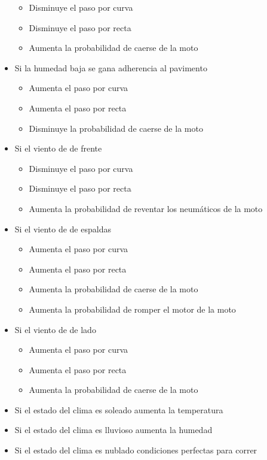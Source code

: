 \documentclass[12pt, letterpaper,spanish]{article}
\theoremstyle{definition}
\theoremstyle{remark}
\begin{document}
\begin{itemize}
\begin{itemize}
			\item Disminuye el paso por curva
			\item Disminuye el paso por recta
			\item Aumenta la probabilidad de caerse de la moto
		\end{itemize}
		\item Si la humedad baja se gana adherencia al pavimento
		\begin{itemize}
			\item Aumenta el paso por curva
			\item Aumenta el paso por recta
			\item Disminuye la probabilidad de caerse de la moto
		\end{itemize}
		
		\item Si el viento de de frente
		\begin{itemize}
			\item Disminuye el paso por curva
			\item Disminuye el paso por recta
			\item Aumenta la probabilidad de reventar los neumáticos de la moto
		\end{itemize}
		\item Si el viento de de espaldas
		\begin{itemize}
			\item Aumenta el paso por curva
			\item Aumenta el paso por recta
			\item Aumenta la probabilidad de caerse de la moto
			\item Aumenta la probabilidad de romper el motor de la moto
		\end{itemize}
		\item Si el viento de de lado
		\begin{itemize}
			\item Aumenta el paso por curva
			\item Aumenta el paso por recta
			\item Aumenta la probabilidad de caerse de la moto
		\end{itemize}
		
		\item Si el estado del clima es soleado aumenta la temperatura
		\item Si el estado del clima es lluvioso aumenta la humedad
		\item Si el estado del clima es nublado condiciones perfectas para correr
		

\end{itemize}
\end{document}
